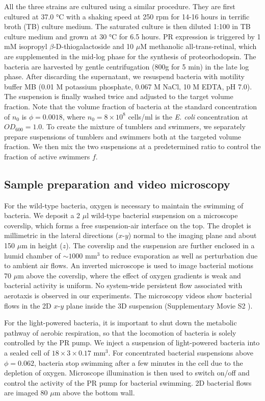 All the three strains are cultured using a similar procedure. They are first cultured at 37.0 °C with a shaking speed at 250 rpm for 14-16 hours in terrific broth (TB) culture medium. The saturated culture is then diluted 1:100 in TB culture medium and grown at 30 °C for 6.5 hours. PR expression is triggered by 1 mM isopropyl $\beta$-D-thiogalactoside and 10 $\mu$M methanolic all-trans-retinal, which are supplemented in the mid-log phase for the synthesis of proteorhodopsin. The bacteria are harvested by gentle centrifugation (800g for 5 min) in the late log phase. After discarding the supernatant, we resuspend bacteria
with motility buffer MB (0.01 M potassium phosphate, 0.067 M NaCl, 10 M EDTA, pH 7.0). The suspension is finally washed twice and adjusted to the target volume fraction. Note that the volume fraction of bacteria at the standard concentration of $n_0$ is $\phi = 0.0018$, where $n_0 = 8 \times 10^8$ cells/ml is the \textit{E. coli} concentration at $OD_{600} = 1.0$. To create the mixture of tumblers and swimmers, we separately prepare suspensions of tumblers and swimmers both at the targeted volume fraction. We then mix the two suspensions at a predetermined ratio to control the fraction of active swimmers $f$.



\subsection{Sample preparation and video microscopy}
For the wild-type bacteria, oxygen is necessary to maintain the swimming of bacteria. We deposit a 2 $\mu$l wild-type bacterial suspension on a microscope coverslip, which forms a free suspension-air interface on the top. The droplet is millimetric in the lateral directions ($x$-$y$) normal to the imaging plane and about 150 $\mu$m in height ($z$). The coverslip and the suspension are further enclosed in a humid chamber of $\sim 1000$
mm$^3$ to reduce evaporation as well as perturbation due to ambient air flows. An inverted microscope is used to image bacterial motions 70 $\mu$m above the coverslip, where the effect of oxygen gradients is weak and bacterial activity is uniform. No system-wide persistent flow associated with aerotaxis is observed in our experiments. The microscopy videos show bacterial flows in the 2D $x$-$y$ plane inside the 3D suspension (Supplementary Movie S2 \cite{suppMovies}).

For the light-powered bacteria, it is important to shut down the metabolic pathway of aerobic respiration, so that the locomotion of bacteria is solely controlled by the PR pump. We inject a suspension of light-powered bacteria into a sealed cell of $18 \times 3 \times 0.17$ mm$^3$. For concentrated bacterial suspensions above $\phi = 0.062$, bacteria stop swimming after a few minutes in the cell due to the depletion of oxygen. Microscope illumination is then used to switch on/off and control the activity of the PR pump for bacterial swimming. 2D bacterial flows are imaged 80 $\mu$m above the bottom wall.

